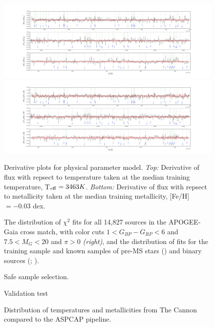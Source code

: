 \documentclass[modern]{aastex62}
\begin{document}
\begin{figure}[ht]
\begin{center}
\includegraphics[width=16cm]{figures/derivative_jackknife_teff.png}
\includegraphics[width=16cm]{figures/derivative_jackknife_feh.png}
\end{center}
\caption{Derivative plots for physical parameter model. \textit{Top:} Derivative of flux with repsect to temperature taken at the median training temperature, T$_{\rm eff}=3463K$. \textit{Bottom:} Derivative of flux with repsect to metallicity taken at the median training metallicity, [Fe/H]$=-0.03$ dex.} \label{fig:mann_derivative}
\end{figure}

\begin{figure}[ht]
\caption{The distribution of $\chi^2$ fits for all 14,827 sources in the APOGEE-Gaia cross match, with color cuts $1<G_{BP}-G_{RP}<6$ and $7.5<M_{G}<20$ and $\pi>0$ \textit{(right)}, and the distribution of fits for the training sample and known samples of pre-MS stars (\citealt{Cottaar:2014}) and binary sources (\citealt{ElBadry:2018}; \citealt{Skinner:2018}).}
\caption{Safe sample selection.}
\end{figure}

\begin{figure}[ht]
\caption{Validation test}
\caption{Distribution of temperatures and metallicities from The Cannon compared to the ASPCAP pipeline.}
\end{figure}
\end{document}
